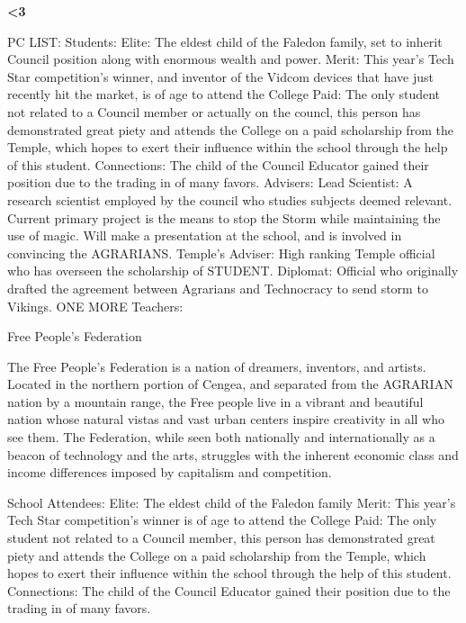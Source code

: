 \documentclass[blue]{GL2020}
\begin{document}
\name{\bTest{}}

\bf{<3}

PC LIST:
	Students:
		Elite: The eldest child of the Faledon family, set to inherit Council position along with enormous 
					wealth and power.
		Merit: This year's Tech Star competition's winner, and inventor of the Vidcom devices that have just
					recently hit the market, is of age to attend the College
		Paid: The only student not related to a Council member or actually on the councl, this person has
					demonstrated great piety and attends the College on a paid scholarship from the Temple, which 
					hopes to exert their influence within the school through the help of this student.
		Connections: The child of the Council Educator gained their position due to the trading in of many favors.
	Advisers:
		Lead Scientist:  A research scientist employed by the council who studies subjects deemed relevant.  Current
					primary project is the means to stop the Storm while maintaining the use of magic.  Will make a
					presentation at the school, and is involved in convincing the AGRARIANS.
		Temple's Adviser:  High ranking Temple official who has overseen the scholarship of STUDENT.
		Diplomat: Official who originally drafted the agreement between Agrarians and Technocracy to send storm
					to Vikings.	
		ONE MORE
	Teachers:

Free People's Federation %

The Free People's Federation is a nation of dreamers, inventors, and artists.  Located in the northern portion of Cengea, and separated from the AGRARIAN nation by a mountain range, the Free people live in a vibrant and beautiful nation whose natural vistas and vast urban centers inspire creativity in all who see them.  The Federation, while seen both nationally and internationally as a beacon of technology and the arts, struggles with the inherent economic class and income differences imposed by capitalism and competition.

School Attendees:
	Elite: The eldest child of the Faledon family
	Merit: This year's Tech Star competition's winner is of age to attend the College
	Paid: The only student not related to a Council member, this person has demonstrated great piety and
		attends the College on a paid scholarship from the Temple, which hopes to exert their influence 
		within the school through the help of this student.
	Connections: The child of the Council Educator gained their position due to the trading in of many favors.
\end{document}
